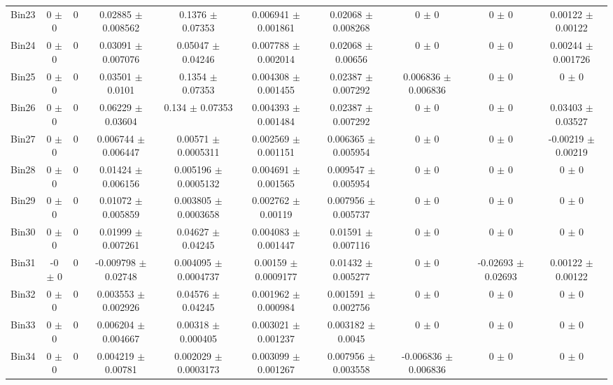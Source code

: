 \begin{tabular}{@{\extracolsep{4pt}}lccccccccc@{}}
     Bin23 & 0 $\pm$ 0 & 0 & 0.02885 $\pm$ 0.008562 & 0.1376 $\pm$ 0.07353 & 0.006941 $\pm$ 0.001861 & 0.02068 $\pm$ 0.008268 & 0 $\pm$ 0 & 0 $\pm$ 0 & 0.00122 $\pm$ 0.00122 \\ 
     Bin24 & 0 $\pm$ 0 & 0 & 0.03091 $\pm$ 0.007076 & 0.05047 $\pm$ 0.04246 & 0.007788 $\pm$ 0.002014 & 0.02068 $\pm$ 0.00656 & 0 $\pm$ 0 & 0 $\pm$ 0 & 0.00244 $\pm$ 0.001726 \\ 
     Bin25 & 0 $\pm$ 0 & 0 & 0.03501 $\pm$ 0.0101 & 0.1354 $\pm$ 0.07353 & 0.004308 $\pm$ 0.001455 & 0.02387 $\pm$ 0.007292 & 0.006836 $\pm$ 0.006836 & 0 $\pm$ 0 & 0 $\pm$ 0 \\ 
     Bin26 & 0 $\pm$ 0 & 0 & 0.06229 $\pm$ 0.03604 & 0.134 $\pm$ 0.07353 & 0.004393 $\pm$ 0.001484 & 0.02387 $\pm$ 0.007292 & 0 $\pm$ 0 & 0 $\pm$ 0 & 0.03403 $\pm$ 0.03527 \\ 
     Bin27 & 0 $\pm$ 0 & 0 & 0.006744 $\pm$ 0.006447 & 0.00571 $\pm$ 0.0005311 & 0.002569 $\pm$ 0.001151 & 0.006365 $\pm$ 0.005954 & 0 $\pm$ 0 & 0 $\pm$ 0 & -0.00219 $\pm$ 0.00219 \\ 
     Bin28 & 0 $\pm$ 0 & 0 & 0.01424 $\pm$ 0.006156 & 0.005196 $\pm$ 0.0005132 & 0.004691 $\pm$ 0.001565 & 0.009547 $\pm$ 0.005954 & 0 $\pm$ 0 & 0 $\pm$ 0 & 0 $\pm$ 0 \\ 
     Bin29 & 0 $\pm$ 0 & 0 & 0.01072 $\pm$ 0.005859 & 0.003805 $\pm$ 0.0003658 & 0.002762 $\pm$ 0.00119 & 0.007956 $\pm$ 0.005737 & 0 $\pm$ 0 & 0 $\pm$ 0 & 0 $\pm$ 0 \\ 
     Bin30 & 0 $\pm$ 0 & 0 & 0.01999 $\pm$ 0.007261 & 0.04627 $\pm$ 0.04245 & 0.004083 $\pm$ 0.001447 & 0.01591 $\pm$ 0.007116 & 0 $\pm$ 0 & 0 $\pm$ 0 & 0 $\pm$ 0 \\ 
     Bin31 & -0 $\pm$ 0 & 0 & -0.009798 $\pm$ 0.02748 & 0.004095 $\pm$ 0.0004737 & 0.00159 $\pm$ 0.0009177 & 0.01432 $\pm$ 0.005277 & 0 $\pm$ 0 & -0.02693 $\pm$ 0.02693 & 0.00122 $\pm$ 0.00122 \\ 
     Bin32 & 0 $\pm$ 0 & 0 & 0.003553 $\pm$ 0.002926 & 0.04576 $\pm$ 0.04245 & 0.001962 $\pm$ 0.000984 & 0.001591 $\pm$ 0.002756 & 0 $\pm$ 0 & 0 $\pm$ 0 & 0 $\pm$ 0 \\ 
     Bin33 & 0 $\pm$ 0 & 0 & 0.006204 $\pm$ 0.004667 & 0.00318 $\pm$ 0.000405 & 0.003021 $\pm$ 0.001237 & 0.003182 $\pm$ 0.0045 & 0 $\pm$ 0 & 0 $\pm$ 0 & 0 $\pm$ 0 \\ 
     Bin34 & 0 $\pm$ 0 & 0 & 0.004219 $\pm$ 0.00781 & 0.002029 $\pm$ 0.0003173 & 0.003099 $\pm$ 0.001267 & 0.007956 $\pm$ 0.003558 & -0.006836 $\pm$ 0.006836 & 0 $\pm$ 0 & 0 $\pm$ 0 \\ 

\end{tabular}
